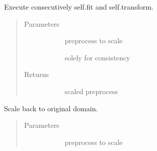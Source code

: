 \documentclass[letterpaper,10pt,english]{sphinxmanual}
\begin{document}
\begin{fulllineitems}
\begin{fulllineitems}
\label{\detokenize{autoapi/src/utils/preprocess/index:src.utils.preprocess.MinMaxScaler.fit_transform}}
Execute consecutively self.fit and self.transform.
\begin{quote}\begin{description}
\item[{Parameters}] \leavevmode\begin{description}
\item[{}] \leavevmode{[}\sphinxcode{\sphinxupquote{np.array}}{]}
preprocess to scale

\item[{}] \leavevmode{[}\sphinxhref{https://docs.python.org/3/library/constants.html\#None}{\sphinxcode{\sphinxupquote{None}}}{]}
solely for consistency

\end{description}

\item[{Returns}] \leavevmode\begin{description}
\item[{}] \leavevmode
scaled preprocess

\end{description}

\end{description}\end{quote}

\end{fulllineitems}


\begin{fulllineitems}
\label{\detokenize{autoapi/src/utils/preprocess/index:src.utils.preprocess.MinMaxScaler.inverse_transform}}
Scale back to original domain.
\begin{quote}\begin{description}
\item[{Parameters}] \leavevmode\begin{description}
\item[{}] \leavevmode{[}\sphinxcode{\sphinxupquote{np.array}}{]}
preprocess to scale


\end{description}
\end{description}
\end{quote}
\end{fulllineitems}
\end{fulllineitems}
\end{document}
